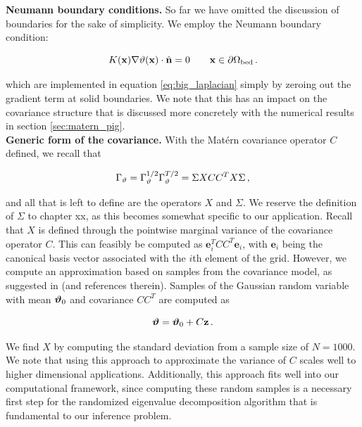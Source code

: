 \noindent\textbf{Neumann boundary conditions.}
So far we have omitted the discussion of boundaries for the sake of
simplicity.
We employ the Neumann boundary condition:
\begin{linenomath*}\begin{equation*}
    K(\mathbf{x})\nabla\vartheta(\mathbf{x}) \cdot \hat{\mathbf{n}} = 0 \qquad \mathbf{x}\in\partial\Omega_{\text{bed}} \, .
\end{equation*}\end{linenomath*}
which are implemented in equation \eqref{eq:big_laplacian}
simply by zeroing out the gradient term at solid boundaries.
We note that this has an impact on the covariance structure that is discussed
more concretely with the numerical results in
section \ref{sec:matern_pig}.\\

\noindent\textbf{Generic form of the covariance.}
With the Mat\'ern covariance operator $C$ defined, we recall that
\begin{linenomath*}\begin{equation*}
    \Gamma_{\vartheta} = \Gamma_{\vartheta}^{1/2}\Gamma_{\vartheta}^{T/2}
    = \Sigma X C C^T X \Sigma \, ,
\end{equation*}\end{linenomath*}
and all that is left to define are the operators $X$ and $\Sigma$.
We reserve the definition of $\Sigma$ to
chapter xx, as this becomes somewhat specific to our
application.
Recall that $X$ is defined through the pointwise marginal variance of the
covariance operator $C$.
This can feasibly be computed as $\mathbf{e}_i^TCC^T\mathbf{e}_i$, with
$\mathbf{e}_i$ being the canonical basis vector associated with the $i$th
element of the grid.
However, we compute an approximation based on samples from the covariance model, as
suggested in \citet{weaver_correlation_2001} (and references therein).
Samples of the Gaussian random variable with mean $\bm{\vartheta}_0$ and covariance
$C C^T$ are computed as
\begin{linenomath*}\begin{equation*}
    \bm{\vartheta} = \bm{\vartheta}_0 + C\mathbf{z} \, .
\end{equation*}\end{linenomath*}
We find $X$ by computing the standard deviation from a sample size of $N=1000$.
We note that using this approach to approximate the variance of $C$ scales well
to higher dimensional applications.
Additionally, this approach fits well into our computational framework, since
computing these random samples is a necessary first step for the randomized
eigenvalue decomposition algorithm that is fundamental to our inference problem.
